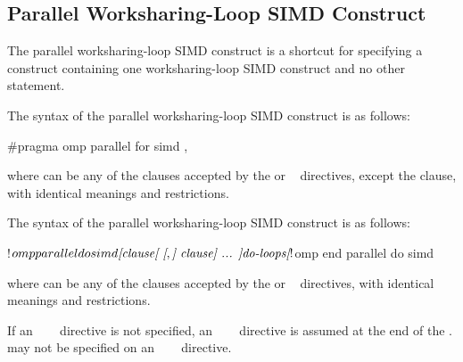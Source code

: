 \subsection{Parallel Worksharing-Loop SIMD Construct}
\label{subsec:Parallel Worksharing-Loop SIMD Construct}
\summary
The parallel worksharing-loop SIMD construct is a shortcut for specifying a  construct
containing one worksharing-loop SIMD construct and no other statement.

\begin{samepage}
\syntax
\begin{ccppspecific}
The syntax of the parallel worksharing-loop SIMD construct is as follows:

\begin{ompcPragma}
#pragma omp parallel for simd \plc{[clause[ [},\plc{] clause] ... ] new-line}
\end{ompcPragma}

where  can be any of the clauses accepted by the 
or ~ directives, except the  clause, with
identical meanings and restrictions.
\end{ccppspecific}
\end{samepage}

\begin{fortranspecific}
\begin{samepage}
The syntax of the parallel worksharing-loop SIMD construct is as follows:

\begin{ompfPragma}
!$omp parallel do simd \plc{[clause[ [},\plc{] clause] ... ]}
    \plc{do-loops}
\plc{[}!$omp end parallel do simd\plc{]}
\end{ompfPragma}
\end{samepage}

where  can be any of the clauses accepted by the 
or ~ directives, with identical meanings and restrictions.

\begin{samepage}
If an ~~~ directive is not specified, an
~~~ directive is assumed at the end of the
.  may not be specified on
an ~~~ directive.
\end{samepage}
\end{fortranspecific}

